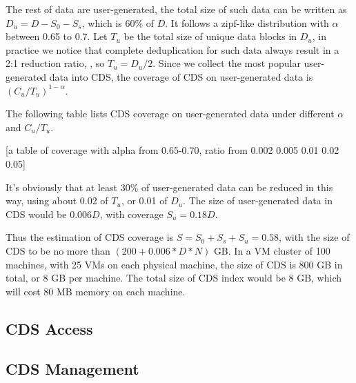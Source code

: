 The rest of data are user-generated, the total size of such data can be written as $D_u=D-S_0-S_s$, which is 60\% of $D$. 
It follows a zipf-like distribution with $\alpha$ between 0.65 to 0.7. 
Let $T_u$ be the total size of unique data blocks in $D_u$,
in practice we notice that complete deduplication for such data always result in a 2:1 reduction ratio,
, so $T_u=D_u/2$.
Since we collect the most popular user-generated data into CDS, the coverage of CDS on user-generated data
is $(C_u/T_u)^{1-\alpha}$.

The following table lists CDS coverage on user-generated data under different $\alpha$ and $C_u/T_u$.

[a table of coverage with alpha from 0.65-0.70, ratio from 0.002 0.005 0.01 0.02 0.05]

It's obviously that at least 30\% of user-generated data can be reduced in this way, using about 0.02 of $T_u$, or 0.01 of $D_u$.
The size of user-generated data in CDS would be 0.006$D$, with coverage $S_u=0.18D$.

Thus the estimation of CDS coverage is $S=S_0+S_s+S_u=0.58$, with the size of CDS to be no more than $(200 + 0.006*D*N)$ GB.
In a VM cluster of 100 machines, with 25 VMs on each physical machine, the size of CDS is 800 GB in total, or 8 GB per machine.
The total size of CDS index would be 8 GB, which will cost 80 MB memory on each machine. 

\subsection{CDS Access}

\subsection{CDS Management}

